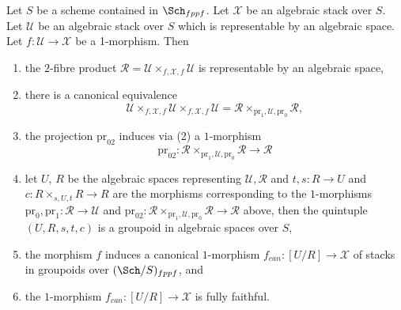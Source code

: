 \begin{lemma}
\label{lemma-map-space-into-stack}
Let $S$ be a scheme contained in $\Sch_{fppf}$.
Let $\mathcal{X}$ be an algebraic stack over $S$.
Let $\mathcal{U}$ be an algebraic stack over $S$ which
is representable by an algebraic space.
Let $f : \mathcal{U} \to \mathcal{X}$ be a 1-morphism. Then
\begin{enumerate}
\item the $2$-fibre product
$\mathcal{R} = \mathcal{U} \times_{f, \mathcal{X}, f} \mathcal{U}$
is representable by an algebraic space,
\item there is a canonical equivalence
$$
\mathcal{U} \times_{f, \mathcal{X}, f} \mathcal{U}
\times_{f, \mathcal{X}, f} \mathcal{U} =
\mathcal{R} \times_{\text{pr}_1, \mathcal{U}, \text{pr}_0} \mathcal{R},
$$
\item the projection $\text{pr}_{02}$ induces via (2) a $1$-morphism
$$
\text{pr}_{02} :
\mathcal{R} \times_{\text{pr}_1, \mathcal{U}, \text{pr}_0} \mathcal{R}
\longrightarrow
\mathcal{R}
$$
\item let $U$, $R$ be the algebraic spaces representing
$\mathcal{U}, \mathcal{R}$ and $t, s : R \to U$ and
$c : R \times_{s, U, t} R \to R$ are the morphisms corresponding
to the $1$-morphisms
$\text{pr}_0, \text{pr}_1 : \mathcal{R} \to \mathcal{U}$
and
$\text{pr}_{02} :
\mathcal{R} \times_{\text{pr}_1, \mathcal{U}, \text{pr}_0} \mathcal{R} \to
\mathcal{R}$ above, then the quintuple $(U, R, s, t, c)$ is a groupoid in
algebraic spaces over $S$,
\item the morphism $f$ induces a canonical $1$-morphism
$f_{can} : [U/R] \to \mathcal{X}$
of stacks in groupoids over $(\Sch/S)_{fppf}$, and
\item the $1$-morphism $f_{can} : [U/R] \to \mathcal{X}$ is fully faithful.
\end{enumerate}
\end{lemma}


